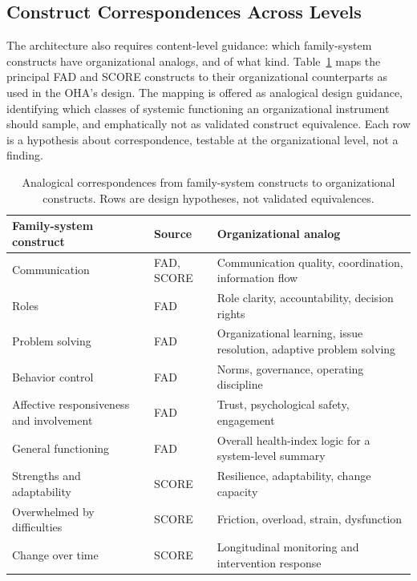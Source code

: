 \documentclass[12pt, letterpaper]{article}
\begin{document}
\subsection{Construct Correspondences Across Levels}
\label{sec:correspondences}

The architecture also requires content-level guidance: which family-system constructs have organizational analogs, and of what kind. Table~\ref{tab:correspondences} maps the principal FAD and SCORE constructs to their organizational counterparts as used in the OHA's design. The mapping is offered as analogical design guidance, identifying which classes of systemic functioning an organizational instrument should sample, and emphatically not as validated construct equivalence. Each row is a hypothesis about correspondence, testable at the organizational level, not a finding.

\begin{table}[htbp]
\centering
\small
\caption{Analogical correspondences from family-system constructs to organizational constructs. Rows are design hypotheses, not validated equivalences.}
\label{tab:correspondences}
\begin{tabular}{p{4.6cm}p{2.0cm}p{6.8cm}}
\toprule
Family-system construct & Source & Organizational analog \\
\midrule
Communication & FAD, SCORE & Communication quality, coordination, information flow \\
\midrule
Roles & FAD & Role clarity, accountability, decision rights \\
\midrule
Problem solving & FAD & Organizational learning, issue resolution, adaptive problem solving \\
\midrule
Behavior control & FAD & Norms, governance, operating discipline \\
\midrule
Affective responsiveness and involvement & FAD & Trust, psychological safety, engagement \\
\midrule
General functioning & FAD & Overall health-index logic for a system-level summary \\
\midrule
Strengths and adaptability & SCORE & Resilience, adaptability, change capacity \\
\midrule
Overwhelmed by difficulties & SCORE & Friction, overload, strain, dysfunction \\
\midrule
Change over time & SCORE & Longitudinal monitoring and intervention response \\
\bottomrule
\end{tabular}
\end{table}
\end{document}
